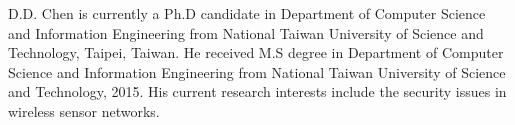 D.D. Chen is currently a Ph.D candidate in Department of Computer Science and Information Engineering from National Taiwan University of Science and Technology, Taipei, Taiwan. He received M.S degree in Department of Computer Science and Information Engineering from National Taiwan University of Science and Technology, 2015. His current research interests include the security issues in wireless sensor networks. 